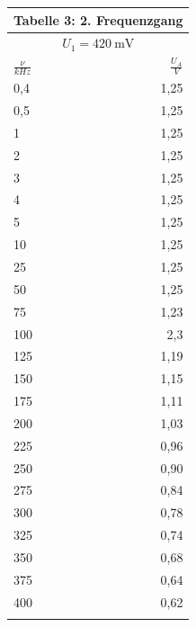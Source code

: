 \documentclass{scrartcl}
\begin{document}
\begin{minipage}{0.6\textwidth}
\begin{tabular}{@{}lr@{}}
     \multicolumn{2}{c}{Tabelle 3: 2. Frequenzgang} \\
      \toprule
    \multicolumn{2}{c}{$U_1 = \SI{420}{\milli \volt}$} \\
    \cmidrule(r){1-2}
    $\frac{\nu}{kHz}$ & $\frac{U_A}{V}$ \\
    \midrule

    0,4 & 1,25 \\
    0,5  & 1,25 \\
    1 & 1,25 \\
    2 & 1,25 \\
    3 &  1,25 \\
    4 & 1,25 \\
    5 & 1,25 \\
    10 & 1,25 \\
     25 & 1,25 \\
     50 & 1,25 \\
     75 & 1,23 \\
     100 & 2,3 \\
     125 & 1,19 \\
     150 & 1,15 \\
     175 & 1,11 \\
     200 & 1,03 \\
     225 & 0,96 \\
     250 & 0,90 \\
     275 & 0,84 \\
     300 & 0,78 \\
     325 & 0,74 \\
     350 & 0,68 \\
     375 & 0,64 \\
     400 & 0,62 \\
          \bottomrule
      \\

\end{tabular}

\end{minipage}


\newpage
\end{document}
